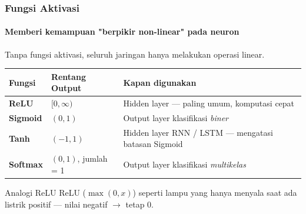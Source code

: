 \documentclass[t,aspectratio=169,xcolor=dvipsnames]{beamer}
\begin{document}
\begin{frame}
    \frametitle{Fungsi Aktivasi}
    \framesubtitle{Memberi kemampuan "berpikir non-linear" pada neuron}
    \small
    Tanpa fungsi aktivasi, seluruh jaringan hanya melakukan operasi linear.

    \vspace{0.2em}
    \begin{center}
    {\footnotesize
    \begin{tabular}{llp{5.2cm}}
        \toprule
        \textbf{Fungsi} & \textbf{Rentang Output} & \textbf{Kapan digunakan} \\
        \midrule
        \textbf{ReLU}    & $[0, \infty)$  & Hidden layer — paling umum, komputasi cepat \\
        \textbf{Sigmoid} & $(0, 1)$       & Output layer klasifikasi \textit{biner} \\
        \textbf{Tanh}    & $(-1, 1)$      & Hidden layer RNN / LSTM — mengatasi batasan Sigmoid \\
        \textbf{Softmax} & $(0, 1)$, jumlah = 1 & Output layer klasifikasi \textit{multikelas} \\
        \bottomrule
    \end{tabular}}
    \end{center}

    \vspace{0.15em}
    \begin{exampleblock}{Analogi ReLU}
        ReLU ($\max(0, x)$) seperti lampu yang hanya menyala saat ada listrik positif — nilai negatif $\rightarrow$ tetap 0.
    \end{exampleblock}
\end{frame}
\end{document}

